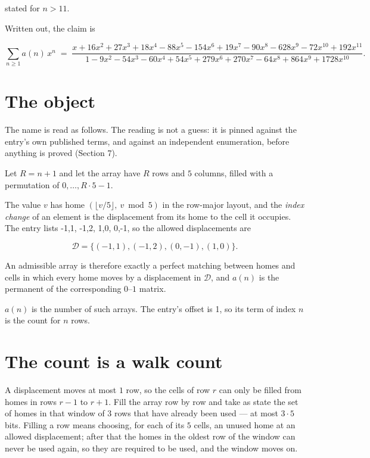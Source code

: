 \documentclass[11pt]{article}
\theoremstyle{definition}
\begin{document}
stated for $n > 11$.

Written out, the claim is

\[\sum_{n \ge 1} a(n)\,x^n \;=\; \frac{x + 16x^{2} + 27x^{3} + 18x^{4} - 88x^{5} - 154x^{6} + 19x^{7} - 90x^{8} - 628x^{9} - 72x^{10} + 192x^{11}}{1 - 9x^{2} - 54x^{3} - 60x^{4} + 54x^{5} + 279x^{6} + 270x^{7} - 64x^{8} + 864x^{9} + 1728x^{10}}.\]

\section{The object}

The name is read as follows. The reading is not a guess: it is pinned against the entry's own published terms, and against an independent enumeration, before anything is proved (Section 7).

Let $R = n + 1$ and let the array have $R$ rows and $5$ columns, filled with a permutation of $0,\dots,R\cdot5-1$.

The value $v$ has home $(\lfloor v/5\rfloor,\ v \bmod 5)$ in the row-major layout, and the {\itshape index change} of an element is the displacement from its home to the cell it occupies. The entry lists -1,1, -1,2, 1,0, 0,-1, so the allowed displacements are

\[\mathcal{D} = \{(-1,1), (-1,2), (0,-1), (1,0)\}.\]

An admissible array is therefore exactly a perfect matching between homes and cells in which every home moves by a displacement in $\mathcal{D}$, and $a(n)$ is the permanent of the corresponding $0$--$1$ matrix.

$a(n)$ is the number of such arrays. The entry's offset is 1, so its term of index $n$ is the count for $n$ rows.

\section{The count is a walk count}

A displacement moves at most $1$ row, so the cells of row $r$ can only be filled from homes in rows $r-1$ to $r+1$. Fill the array row by row and take as state the set of homes in that window of $3$ rows that have already been used --- at most $3\cdot5$ bits. Filling a row means choosing, for each of its $5$ cells, an unused home at an allowed displacement; after that the homes in the oldest row of the window can never be used again, so they are required to be used, and the window moves on.
\end{document}
